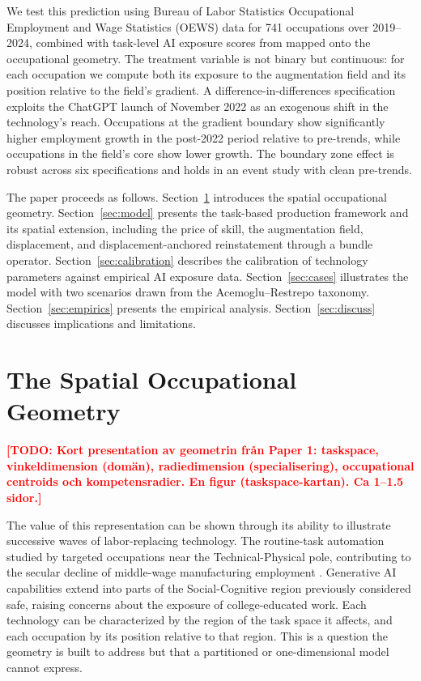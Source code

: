 \documentclass[12pt, a4paper]{article}
\newcommand{\todo}[1]{\textcolor{red}{\textbf{[TODO: #1]}}}
\begin{document}
We test this prediction using Bureau of Labor Statistics Occupational
Employment and Wage Statistics (OEWS) data for 741 occupations over
2019--2024, combined with task-level AI exposure scores from
\textcite{gmyrek2025} mapped onto the occupational geometry. The
treatment variable is not binary but continuous: for each occupation
we compute both its exposure to the augmentation field and its position
relative to the field's gradient. A difference-in-differences
specification exploits the ChatGPT launch of November 2022 as an
exogenous shift in the technology's reach. Occupations at the gradient
boundary show significantly higher employment growth in the post-2022
period relative to pre-trends, while occupations in the field's core
show lower growth. The boundary zone effect is robust across six
specifications and holds in an event study with clean pre-trends.

The paper proceeds as follows. Section~\ref{sec:geometry} introduces
the spatial occupational geometry. Section~\ref{sec:model} presents
the task-based production framework and its spatial extension,
including the price of skill, the augmentation field, displacement,
and displacement-anchored reinstatement through a bundle operator.
Section~\ref{sec:calibration} describes the calibration of technology
parameters against empirical AI exposure data. Section~\ref{sec:cases}
illustrates the model with two scenarios drawn from the
Acemoglu--Restrepo taxonomy. Section~\ref{sec:empirics} presents the
empirical analysis. Section~\ref{sec:discuss} discusses implications
and limitations.

\section{The Spatial Occupational Geometry}
\label{sec:geometry}

\todo{Kort presentation av geometrin från Paper 1: taskspace,
vinkeldimension (domän), radiedimension (specialisering),
occupational centroids och kompetensradier. En figur (taskspace-kartan).
Ca 1--1.5 sidor.}

The value of this representation can be shown through its ability to illustrate successive waves of labor-replacing technology. 
The routine-task automation studied by \textcite{autor2003} targeted occupations near the Technical-Physical pole, contributing to the secular decline of middle-wage manufacturing employment \parencite{acemoglu2020, graetz2018, devries2020}. 
Generative AI capabilities \parencite{hampole2025, eloundou2024} extend into parts of the Social-Cognitive region previously considered safe, raising concerns about the exposure of college-educated work. 
Each technology can be characterized by the region of the task space it affects, and each occupation by its position relative to that region. 
This is a question the geometry is built to address but that a partitioned or one-dimensional model cannot express.
\end{document}
